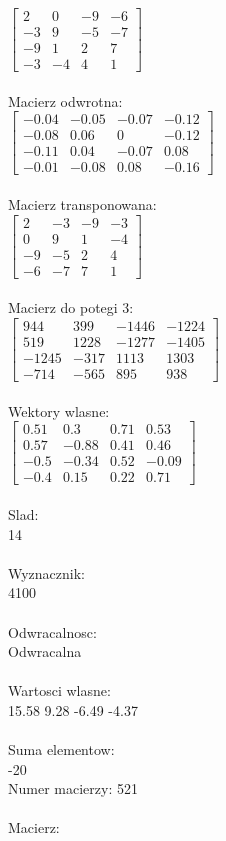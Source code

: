\documentclass[a4paper,12pt]{article}
\begin{document}
$\begin{bmatrix} 2&0&-9&-6\\-3&9&-5&-7\\-9&1&2&7\\-3&-4&4&1 \end{bmatrix}$
\\
\\
Macierz odwrotna:\\

$\begin{bmatrix} -0.04&-0.05&-0.07&-0.12\\-0.08&0.06&0&-0.12\\-0.11&0.04&-0.07&0.08\\-0.01&-0.08&0.08&-0.16 \end{bmatrix}$
\\
\\
Macierz transponowana:\\

$\begin{bmatrix} 2&-3&-9&-3\\0&9&1&-4\\-9&-5&2&4\\-6&-7&7&1 \end{bmatrix}$
\\
\\
Macierz do potegi 3:\\

$\begin{bmatrix} 944&399&-1446&-1224\\519&1228&-1277&-1405\\-1245&-317&1113&1303\\-714&-565&895&938 \end{bmatrix}$
\\
\\
Wektory wlasne:\\

$\begin{bmatrix} 0.51&0.3&0.71&0.53\\0.57&-0.88&0.41&0.46\\-0.5&-0.34&0.52&-0.09\\-0.4&0.15&0.22&0.71 \end{bmatrix}$
\\
\\
Slad:\\
14
\\
\\
Wyznacznik:\\
4100
\\
\\
Odwracalnosc:\\
Odwracalna
\\
\\
Wartosci wlasne:\\
15.58 9.28 -6.49 -4.37
\\
\\
Suma elementow:\\
-20
\\
\newpage
Numer macierzy:
521
\\
\\
Macierz:\\
\end{document}
